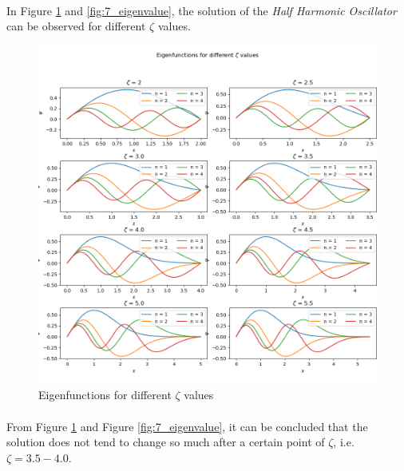 \documentclass[letterpaper,12pt]{article}
\begin{document}
\paragraph{} In Figure \ref{fig:7_eigenfunctions} and \ref{fig:7_eigenvalue}, the solution of the \textit{Half Harmonic Oscillator} can be observed for different $\zeta$ values. 
\begin{figure}[H]
\centerline{\includegraphics[width=\linewidth]{figures/7_eigenfunctions.png}}
\caption{Eigenfunctions for different $\zeta$ values}
\label{fig:7_eigenfunctions}
\end{figure}

\paragraph{} From Figure \ref{fig:7_eigenfunctions} and Figure \ref{fig:7_eigenvalue}, it can be concluded that the solution does not tend to change so much after a certain point of $\zeta$, i.e. $\zeta = 3.5 - 4.0$.
\end{document}
